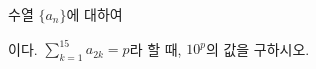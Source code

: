 수열 $\{a_n\}$에 대하여\par\smallskip{}\par\smallskip\noindent 이다. $\displaystyle\sum_{k=1}^{15} a_{2k}=p$라 할 때, $10^p$의 값을 구하시오.
